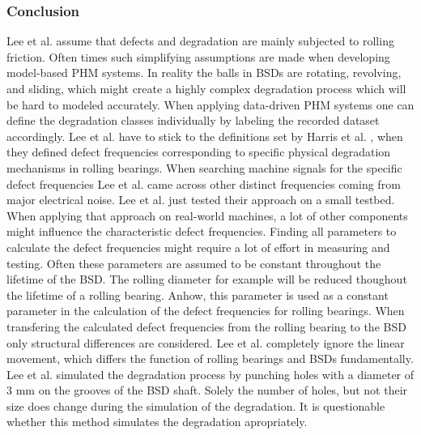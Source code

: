 \subsubsection{Conclusion}
Lee et al. assume that defects and degradation are mainly subjected to rolling friction. Often times such simplifying assumptions are made when developing model-based PHM systems. In reality the balls in BSDs are rotating, revolving, and sliding, which might create a highly complex degradation process which will be hard to modeled accurately. When applying data-driven PHM systems one can define the degradation classes individually by labeling the recorded dataset accordingly. Lee et al. have to stick to the definitions set by Harris et al. \cite{Harris1996}, when they defined defect frequencies corresponding to specific physical degradation mechanisms in rolling bearings. When searching machine signals for the specific defect frequencies Lee et al. came across other distinct frequencies coming from major electrical noise. Lee et al. just tested their approach on a small testbed. When applying that approach on real-world machines, a lot of other components might influence the characteristic defect frequencies. Finding all parameters to calculate the defect frequencies might require a lot of effort in measuring and testing. Often these parameters are assumed to be constant throughout the lifetime of the BSD. The rolling diameter for example will be reduced thoughout the lifetime of a rolling bearing. Anhow, this parameter is used as a constant parameter in the calculation of the defect frequencies for rolling bearings. When transfering the calculated defect frequencies from the rolling bearing to the BSD only structural differences are considered. Lee et al. completely ignore the linear movement, which differs the function of rolling bearings and BSDs fundamentally. Lee et al. simulated the degradation process by punching holes with a diameter of 3 mm on the grooves of the BSD shaft. Solely the number of holes, but not their size does change during the simulation of the degradation. It is questionable whether this method simulates the degradation apropriately.  


